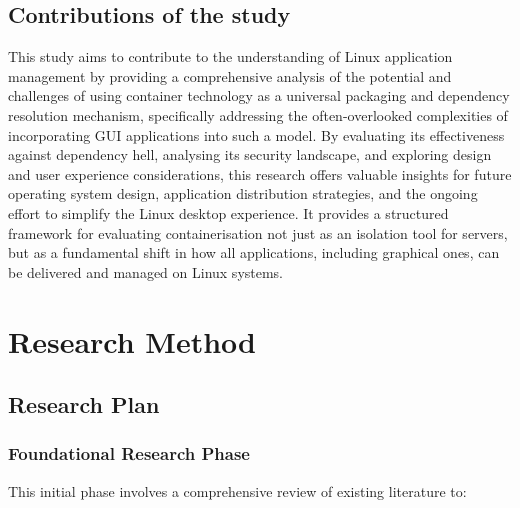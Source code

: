 \documentclass[journal,onecolumn]{IEEEtran}
\begin{document}
\subsection{Contributions of the study}
This study aims to contribute to the understanding of Linux application management by providing a comprehensive analysis of the potential and challenges of using container technology as a universal packaging and dependency resolution mechanism, specifically addressing the often-overlooked complexities of incorporating GUI applications into such a model. By evaluating its effectiveness against dependency hell, analysing its security landscape, and exploring design and user experience considerations, this research offers valuable insights for future operating system design, application distribution strategies, and the ongoing effort to simplify the Linux desktop experience. It provides a structured framework for evaluating containerisation not just as an isolation tool for servers, but as a fundamental shift in how all applications, including graphical ones, can be delivered and managed on Linux systems.

\newpage
\section{Research Method}
\subsection{Research Plan}
\subsubsection{Foundational Research Phase}

This initial phase involves a comprehensive review of existing literature to: 
\end{document}
